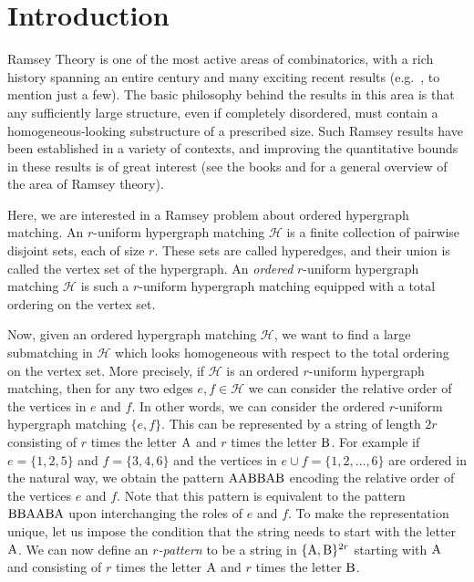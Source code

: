 \documentclass{aic}
\theoremstyle{definition}
\numberwithin{equation}{section}
\numberwithin{figure}{section}
\newcommand{\HH}{\mathcal{H}}
\begin{document}


\section{Introduction}

Ramsey Theory is one of the most active areas of combinatorics, with a rich history spanning an entire century and many exciting recent results (e.g.~\cite{Campos, Lee, MV, RR}, to mention just a few). The basic philosophy behind the results in this area is that any sufficiently large structure, even if completely disordered, must contain a homogeneous-looking substructure of a prescribed size. Such Ramsey results have been established in a variety of contexts, and improving the quantitative bounds in these results is of great interest (see the books \cite{graham-rothschild-spencer} and \cite{promel} for a general overview of the area of Ramsey theory).

Here, we are interested in a Ramsey problem about ordered hypergraph matching. An $r$-uniform hypergraph matching $\HH$ is a finite collection of pairwise disjoint sets, each of size $r$. These sets are called hyperedges, and their union is called the vertex set of the hypergraph. An \emph{ordered} $r$-uniform hypergraph matching $\HH$ is such a $r$-uniform hypergraph matching equipped with a total ordering on the vertex set.

Now, given an ordered hypergraph matching $\HH$, we want to find a large submatching in $\HH$ which looks homogeneous with respect to the total ordering on the vertex set.
More precisely, if $\HH$ is an ordered $r$-uniform hypergraph matching, then for any two edges $e,f\in\HH$ we can consider the relative order of the vertices in $e$ and $f$. In other words, we can consider the ordered $r$-uniform hypergraph matching $\{ e,f\}$. This can be represented by a string of length $2r$ consisting of $r$ times the letter $\rm A$ and $r$ times the letter $\rm B$. For example if $e=\{ 1,2,5\}$ and $f=\{ 3,4,6\}$ and the vertices in $e\cup f=\{1,2,\dots,6\}$ are ordered in the natural way, we obtain the pattern $\rm AABBAB$ encoding the relative order of the vertices $e$ and $f$. Note that this pattern is equivalent to the pattern $\rm BBAABA$ upon interchanging the roles of $e$ and $f$. To make the representation unique, let us impose the condition that the string needs to start with the letter $\rm A$. We can now define an \emph{$r$-pattern} to be a string in $\{{\rm A},{\rm B}\}^{2r}$ starting with $\rm A$ and consisting of $r$ times the letter $\rm A$ and $r$ times the letter $\rm B$.
\end{document}
